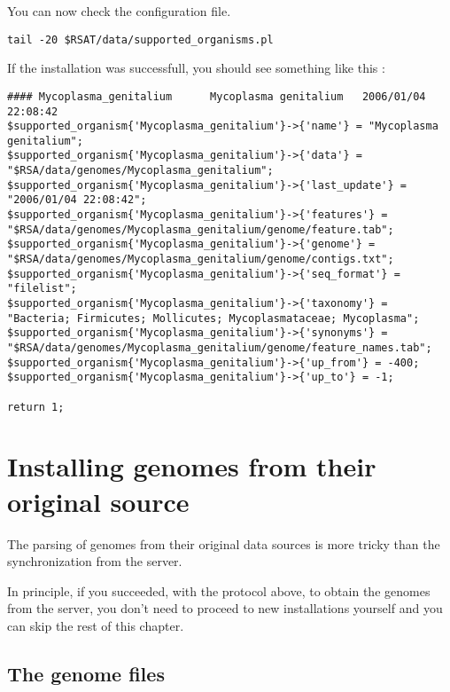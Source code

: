 You can now check the configuration file.

\begin{small}
\begin{verbatim}
tail -20 $RSAT/data/supported_organisms.pl
\end{verbatim}
\end{small}

If the installation was successfull, you should see something like this : 

\begin{small}
\begin{verbatim}
#### Mycoplasma_genitalium      Mycoplasma genitalium   2006/01/04 22:08:42
$supported_organism{'Mycoplasma_genitalium'}->{'name'} = "Mycoplasma genitalium";
$supported_organism{'Mycoplasma_genitalium'}->{'data'} = "$RSA/data/genomes/Mycoplasma_genitalium";
$supported_organism{'Mycoplasma_genitalium'}->{'last_update'} = "2006/01/04 22:08:42";
$supported_organism{'Mycoplasma_genitalium'}->{'features'} = "$RSA/data/genomes/Mycoplasma_genitalium/genome/feature.tab";
$supported_organism{'Mycoplasma_genitalium'}->{'genome'} = "$RSA/data/genomes/Mycoplasma_genitalium/genome/contigs.txt";
$supported_organism{'Mycoplasma_genitalium'}->{'seq_format'} = "filelist";
$supported_organism{'Mycoplasma_genitalium'}->{'taxonomy'} = "Bacteria; Firmicutes; Mollicutes; Mycoplasmataceae; Mycoplasma";
$supported_organism{'Mycoplasma_genitalium'}->{'synonyms'} = "$RSA/data/genomes/Mycoplasma_genitalium/genome/feature_names.tab";
$supported_organism{'Mycoplasma_genitalium'}->{'up_from'} = -400;
$supported_organism{'Mycoplasma_genitalium'}->{'up_to'} = -1;

return 1;
\end{verbatim}
\end{small}


\section{Installing genomes from  their original source}

The parsing of genomes from their original data
sources is more tricky than the synchronization from the \RSAT server.

In principle, if you succeeded, with the protocol above, to obtain the
genomes from the \RSAT server, you don't need to proceed to new
installations yourself and you can skip the rest of this chapter.

\subsection{The \RSAT genome files}


